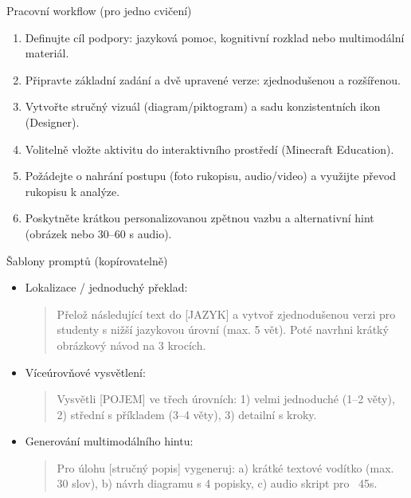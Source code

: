 \documentclass{report}%
\begin{document}
Pracovní workflow (pro jedno cvičení)
\begin{enumerate}
  \item Definujte cíl podpory: jazyková pomoc, kognitivní rozklad nebo multimodální materiál.
  \item Připravte základní zadání a dvě upravené verze: zjednodušenou a rozšířenou.
  \item Vytvořte stručný vizuál (diagram/piktogram) a sadu konzistentních ikon (Designer).
  \item Volitelně vložte aktivitu do interaktivního prostředí (Minecraft Education).
  \item Požádejte o nahrání postupu (foto rukopisu, audio/video) a využijte převod rukopisu k analýze.
  \item Poskytněte krátkou personalizovanou zpětnou vazbu a alternativní hint (obrázek nebo 30–60 s audio).
\end{enumerate}

Šablony promptů (kopírovatelně)
\begin{itemize}
  \item Lokalizace / jednoduchý překlad:
    \begin{quote}
      
\begin{PromptBlock}


Přelož následující text do [JAZYK] a vytvoř zjednodušenou verzi pro studenty s nižší jazykovou úrovní (max. 5 vět). Poté navrhni krátký obrázkový návod na 3 krocích.
\end{PromptBlock}


    \end{quote}
  \item Víceúrovňové vysvětlení:
    \begin{quote}
      
\begin{PromptBlock}


Vysvětli [POJEM] ve třech úrovních: 1) velmi jednoduché (1–2 věty), 2) střední s příkladem (3–4 věty), 3) detailní s kroky.
\end{PromptBlock}


    \end{quote}
  \item Generování multimodálního hintu:
    \begin{quote}
      
\begin{PromptBlock}


Pro úlohu [stručný popis] vygeneruj: a) krátké textové vodítko (max. 30 slov), b) návrh diagramu s 4 popisky, c) audio skript pro ~45s.
\end{PromptBlock}


    \end{quote}
\end{itemize}
\end{document}
